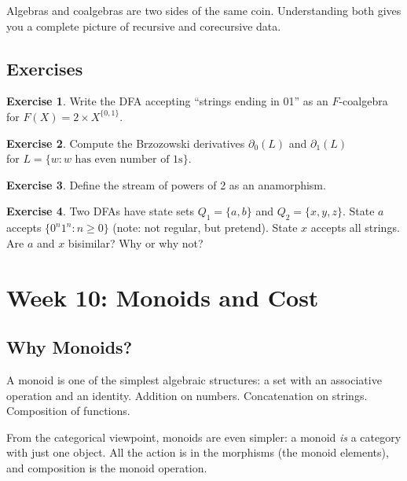 \documentclass[11pt]{article}
\theoremstyle{definition}
\newtheorem{exercise}{Exercise}[section]
\theoremstyle{plain}
\theoremstyle{remark}
\begin{document}
Algebras and coalgebras are two sides of the same coin. Understanding both gives you a complete picture of recursive and corecursive data.

\subsection{Exercises}

\begin{exercise}
Write the DFA accepting ``strings ending in 01'' as an $F$-coalgebra for $F(X) = 2 \times X^{\{0,1\}}$.
\end{exercise}

\begin{exercise}
Compute the Brzozowski derivatives $\partial_0(L)$ and $\partial_1(L)$\\
for $L = \{w : w \text{ has even number of 1s}\}$.
\end{exercise}

\begin{exercise}
Define the stream of powers of 2 as an anamorphism.
\end{exercise}

\begin{exercise}
Two DFAs have state sets $Q_1 = \{a, b\}$ and $Q_2 = \{x, y, z\}$. State $a$ accepts $\{0^n1^n : n \geq 0\}$ (note: not regular, but pretend). State $x$ accepts all strings. Are $a$ and $x$ bisimilar? Why or why not?
\end{exercise}

\section{Week 10: Monoids and Cost}

\subsection*{Why Monoids?}

A monoid is one of the simplest algebraic structures: a set with an associative operation and an identity. Addition on numbers. Concatenation on strings. Composition of functions.

From the categorical viewpoint, monoids are even simpler: a monoid \emph{is} a category with just one object. All the action is in the morphisms (the monoid elements), and composition is the monoid operation.
\end{document}
